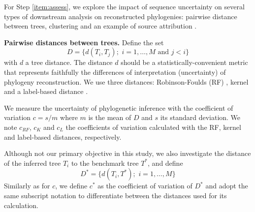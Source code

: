 \documentclass[10pt]{article}
\begin{document}
For Step \ref{item:assess}, we explore the impact of sequence uncertainty on several types of downstream analysis on reconstructed phylogenies: pairwise distance between trees, clustering and an example of source attribution .


\textbf{Pairwise distances between trees.}
Define the set 
\begin{equation}
D = \{d(T_i,T_j);\,\, i=1,\ldots, M \text{ and } j<i \}
\end{equation}
with $d$ a tree distance. 
The distance $d$ should be a statistically-convenient metric that represents faithfully the differences of interpretation (\ie uncertainty) of phylogeny reconstruction. 
We use three distances:  Robinson-Foulds (RF) \cite{Robinson:1981}, kernel \cite{Poon:2013} and a label-based distance \cite{xxx}. 

We measure the uncertainty of phylogenetic inference with the coefficient of variation $c = s / m$ where $m$ is the mean of $D$ and $s$ its standard deviation.
We note $c_{RF}$, $c_K$ and $c_{L}$ the coefficients of variation calculated with the RF, kernel and label-based distances, respectively.

Although not our primary objective in this study, we also investigate the distance of the inferred tree $T_i$ to the benchmark tree $T^*$, and define 
\begin{equation}
D^* = \{d(T_i,T^*);\,\, i=1,\ldots, M \} 
\end{equation}
Similarly as for $c$, we define $c^*$ as the coefficient of variation of $D^*$ and adopt the same subscript notation to differentiate between the distances used for its calculation.
\end{document}
